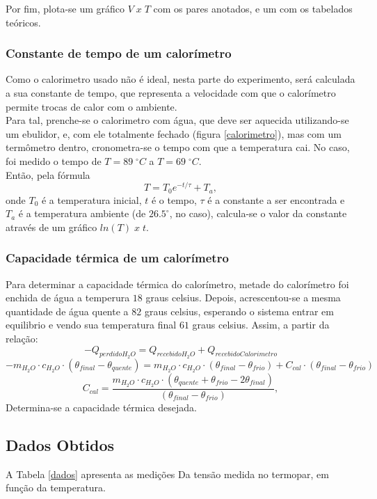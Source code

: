 \documentclass[12pt,a4paper]{article}
\begin{document}
Por fim, plota-se um gráfico $V \; x \; T$ com os pares anotados, e um com os tabelados teóricos.\\

\subsubsection{Constante de tempo de um calorímetro}

Como o calorimetro usado não é ideal, nesta parte do experimento, será calculada a sua constante de tempo, que representa a velocidade com que o calorímetro permite trocas de calor com o ambiente.\\
Para tal, prenche-se o calorimetro com água, que deve ser aquecida utilizando-se um ebulidor, e, com ele totalmente fechado (figura \ref{calorimetro}), mas com um termômetro dentro, cronometra-se o tempo com que a temperatura cai. No caso, foi medido o tempo de $T = 89 \; ^{\circ} C$ a $T = 69 \; ^{\circ} C$.\\
Então, pela fórmula 
$$T = T_0 e ^{-t/\tau} + T_a,$$
onde $T_0$ é a temperatura inicial, $t$ é o tempo, $\tau$ é a constante a ser encontrada e $T_a$ é a temperatura ambiente (de $26.5 ^{\circ}$, no caso), calcula-se o valor da constante através de um gráfico $ln(T) \; x \; t$.
\subsubsection{Capacidade térmica de um calorímetro}
Para determinar a capacidade térmica do calorímetro, metade do calorímetro foi enchida de água a temperura $18$ graus celsius. Depois, acrescentou-se a mesma quantidade de água quente a $82$ graus celsius, esperando o sistema entrar em equilibrio e vendo sua temperatura final $61$ graus celsius. Assim, a partir da relação:
$$-Q_{perdido H_2O} = Q_{recebido H_2O} + Q_{recebido Calorimetro}$$
$$-m_{H_2O}\cdot c_{H_2O} \cdot (\theta_{final}-\theta_{quente}) = m_{H_2O}\cdot c_{H_2O} \cdot (\theta_{final}-\theta_{frio}) + C_{cal}\cdot (\theta_{final}-\theta_{frio}) $$
$$C_{cal} = \frac{m_{H_2O}\cdot c_{H_2O}\cdot(\theta_{quente} + \theta_{frio} -2\theta_{final})}{(\theta_{final}-\theta_{frio})},$$
Determina-se a capacidade térmica desejada.


\subsection{Dados Obtidos}

A Tabela \ref{dados} apresenta as medições Da tensão medida no termopar, em função da temperatura.
\end{document}
